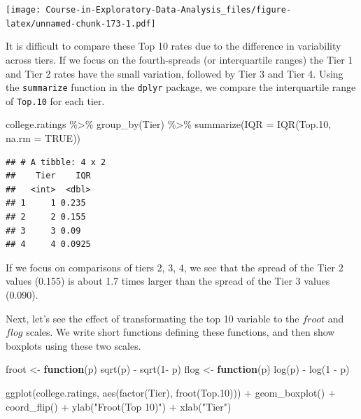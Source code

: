 \documentclass[
]{book}
\newenvironment{Shaded}{\begin{snugshade}}{\end{snugshade}}
\newcommand{\AttributeTok}[1]{\textcolor[rgb]{0.77,0.63,0.00}{#1}}
\newcommand{\ConstantTok}[1]{\textcolor[rgb]{0.00,0.00,0.00}{#1}}
\newcommand{\ControlFlowTok}[1]{\textcolor[rgb]{0.13,0.29,0.53}{\textbf{#1}}}
\newcommand{\DecValTok}[1]{\textcolor[rgb]{0.00,0.00,0.81}{#1}}
\newcommand{\FloatTok}[1]{\textcolor[rgb]{0.00,0.00,0.81}{#1}}
\newcommand{\FunctionTok}[1]{\textcolor[rgb]{0.00,0.00,0.00}{#1}}
\newcommand{\NormalTok}[1]{#1}
\newcommand{\OtherTok}[1]{\textcolor[rgb]{0.56,0.35,0.01}{#1}}
\newcommand{\SpecialCharTok}[1]{\textcolor[rgb]{0.00,0.00,0.00}{#1}}
\newcommand{\StringTok}[1]{\textcolor[rgb]{0.31,0.60,0.02}{#1}}
\begin{document}
\texttt{[image: Course-in-Exploratory-Data-Analysis\_files/figure-latex/unnamed-chunk-173-1.pdf]}

It is difficult to compare these Top 10 rates due to the difference in variability across tiers. If we focus on the fourth-spreads (or interquartile ranges) the Tier 1 and Tier 2 rates have the small variation, followed by Tier 3 and Tier 4. Using the \texttt{summarize} function in the \texttt{dplyr} package, we compare the interquartile range of \texttt{Top.10} for each tier.

\begin{Shaded}
\begin{Highlighting}[]
\NormalTok{college.ratings }\SpecialCharTok{\%\textgreater{}\%} 
  \FunctionTok{group\_by}\NormalTok{(Tier) }\SpecialCharTok{\%\textgreater{}\%} 
  \FunctionTok{summarize}\NormalTok{(}\AttributeTok{IQR =} \FunctionTok{IQR}\NormalTok{(Top}\FloatTok{.10}\NormalTok{, }\AttributeTok{na.rm =} \ConstantTok{TRUE}\NormalTok{))}
\end{Highlighting}
\end{Shaded}

\begin{verbatim}
## # A tibble: 4 x 2
##    Tier    IQR
##   <int>  <dbl>
## 1     1 0.235 
## 2     2 0.155 
## 3     3 0.09  
## 4     4 0.0925
\end{verbatim}

If we focus on comparisons of tiers 2, 3, 4, we see that the spread of the Tier 2 values (0.155) is about 1.7 times larger than the spread of the Tier 3 values (0.090).

Next, let's see the effect of transformating the top 10 variable to the \(froot\) and \(flog\) scales. We write short functions defining these functions, and then show boxplots using these two scales.

\begin{Shaded}
\begin{Highlighting}[]
\NormalTok{froot }\OtherTok{\textless{}{-}} \ControlFlowTok{function}\NormalTok{(p) }\FunctionTok{sqrt}\NormalTok{(p) }\SpecialCharTok{{-}} \FunctionTok{sqrt}\NormalTok{(}\DecValTok{1}\SpecialCharTok{{-}}\NormalTok{ p)}
\NormalTok{flog }\OtherTok{\textless{}{-}} \ControlFlowTok{function}\NormalTok{(p) }\FunctionTok{log}\NormalTok{(p) }\SpecialCharTok{{-}} \FunctionTok{log}\NormalTok{(}\DecValTok{1} \SpecialCharTok{{-}}\NormalTok{ p)}
\end{Highlighting}
\end{Shaded}

\begin{Shaded}
\begin{Highlighting}[]
\FunctionTok{ggplot}\NormalTok{(college.ratings,}
       \FunctionTok{aes}\NormalTok{(}\FunctionTok{factor}\NormalTok{(Tier), }\FunctionTok{froot}\NormalTok{(Top}\FloatTok{.10}\NormalTok{))) }\SpecialCharTok{+}
  \FunctionTok{geom\_boxplot}\NormalTok{() }\SpecialCharTok{+} \FunctionTok{coord\_flip}\NormalTok{() }\SpecialCharTok{+}
  \FunctionTok{ylab}\NormalTok{(}\StringTok{"Froot(Top 10)"}\NormalTok{) }\SpecialCharTok{+} \FunctionTok{xlab}\NormalTok{(}\StringTok{"Tier"}\NormalTok{)}
\end{Highlighting}
\end{Shaded}
\end{document}
